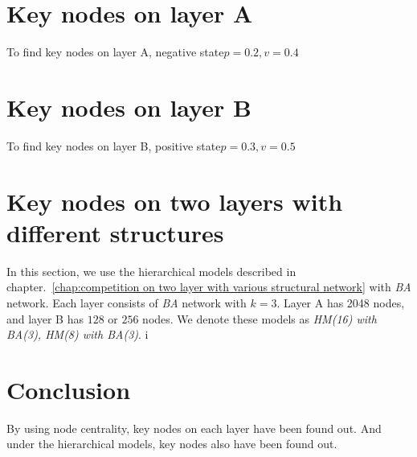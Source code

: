 \section{Key nodes on layer A}
To find key nodes on layer A, negative state$p=0.2, v=0.4$


\section{Key nodes on layer B}
To find key nodes on layer B, positive state$p=0.3, v=0.5$


\section{Key nodes on two layers with different structures}
In this section, we use the hierarchical models described in chapter.~\ref{chap:competition on two layer with various structural network} with \textit{BA} network. Each layer consists of \textit{BA} network with $k=3$. Layer A has 2048 nodes, and layer B has $128$ or $256$ nodes. We denote these models as \textit{HM(16) with BA(3), HM(8) with BA(3)}. 
i
\section{Conclusion}
By using node centrality, key nodes on each layer have been found out. 
And under the hierarchical models, key nodes also have been found out. 